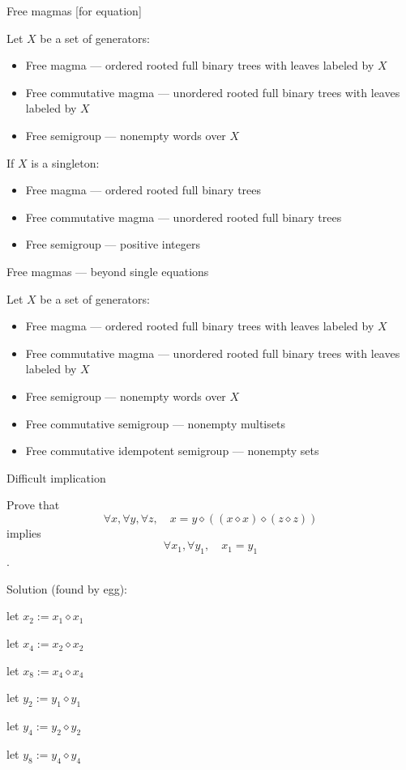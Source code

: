 \documentclass{beamer}
\newcommand{\op}{\diamond}
\begin{document}
\begin{frame}{Free magmas [for equation]}

Let $X$ be a set of generators:
\begin{itemize}
	\pause \item Free magma --- \pause ordered rooted full binary trees with leaves labeled by $X$
	\pause \item Free commutative magma --- \pause unordered rooted full binary trees with leaves labeled by $X$
	\pause \item Free semigroup --- \pause nonempty words over $X$
\end{itemize}
\pause
If $X$ is a singleton:
\begin{itemize}
	\pause \item Free magma --- \pause ordered rooted full binary trees
	\pause \item Free commutative magma --- \pause unordered rooted full binary trees
	\pause \item Free semigroup --- \pause positive integers
\end{itemize}

\end{frame}


\begin{frame}{Free magmas --- beyond single equations}

Let $X$ be a set of generators:
\begin{itemize}
	\item Free magma --- ordered rooted full binary trees with leaves labeled by $X$
	\item Free commutative magma --- unordered rooted full binary trees with leaves labeled by $X$
	\item Free semigroup --- nonempty words over $X$
	\pause \item Free commutative semigroup --- \pause nonempty multisets
	\pause \item Free commutative idempotent semigroup --- \pause nonempty sets
\end{itemize}

\end{frame}


\begin{frame}{Difficult implication}

Prove that
$$ \forall x, \forall y,\forall z,\quad x = y \op ((x \op x) \op (z \op z)) $$
implies
$$ \forall x_1, \forall y_1,\quad x_1 = y_1 $$
.

\pause
Solution (found by egg):\smallskip

let $x_2 := x_1 \op x_1$

let $x_4 := x_2 \op x_2$

let $x_8 := x_4 \op x_4$

let $y_2 := y_1 \op y_1$

let $y_4 := y_2 \op y_2$

let $y_8 := y_4 \op y_4$


\end{frame}
\end{document}
